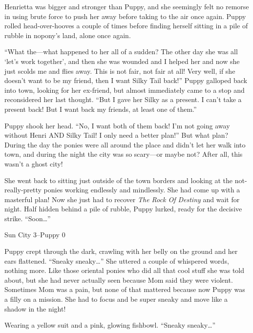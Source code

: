Henrietta was bigger and stronger than Puppy, and she seemingly felt no remorse in using brute force to push her away before taking to the air once again. Puppy rolled head-over-hooves a couple of times before finding herself sitting in a pile of rubble in nopony's land, alone once again.

``What the---what happened to her all of a sudden? The other day she was all `let's work together', and then she was wounded and I helped her and now she just scolds me and flies away. This is not fair, not fair at all! Very well, if she doesn't want to be my friend, then I want Silky Tail back!'' Puppy galloped back into town, looking for her ex-friend, but almost immediately came to a stop and reconsidered her last thought. ``But I gave her Silky as a present. I can't take a present back! But I want back my friends, at least one of them.''

Puppy shook her head. ``No, I want both of them back! I'm not going away without Henri AND Silky Tail! I only need a better plan!'' But what plan? During the day the ponies were all around the place and didn't let her walk into town, and during the night the city was so scary---or maybe not? After all, this wasn't a ghost city!

She went back to sitting just outside of the town borders and looking at the not-really-pretty ponies working endlessly and mindlessly. She had come up with a masterful plan! Now she just had to recover \emph{The Rock Of Destiny}\/ and wait for night. Half hidden behind a pile of rubble, Puppy lurked, ready for the decisive strike. ``Soon\dots''


\begin{center}
	Sun City 3--Puppy 0
\end{center}

\horizonline


Puppy crept through the dark, crawling with her belly on the ground and her ears flattened. ``Sneaky sneaky\dots'' She uttered a couple of whispered words, nothing more. Like those oriental ponies who did all that cool stuff she was told about, but she had never actually seen because Mom said they were violent. Sometimes Mom was a pain, but none of that mattered because now Puppy was a filly on a mission. She had to focus and be super sneaky and move like a shadow in the night!

Wearing a yellow suit and a pink, glowing fishbowl. ``Sneaky sneaky\dots''

